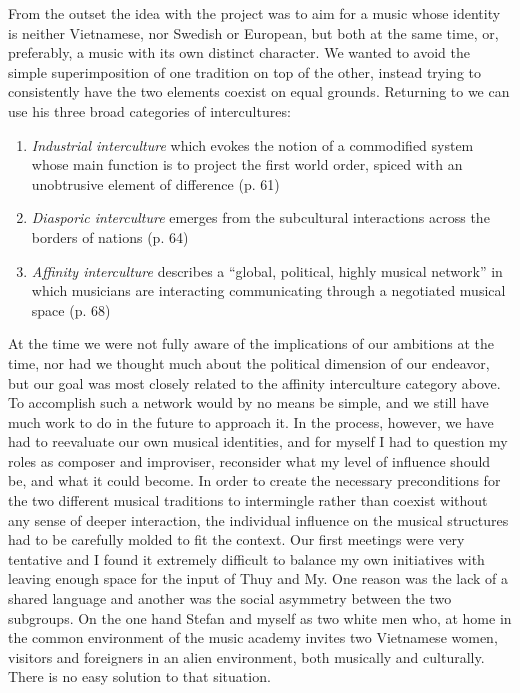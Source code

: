 \documentclass[a4paper]{article}
\begin{document}
From the outset the idea with the project was to aim for a music whose identity is neither Vietnamese, nor Swedish or European, but both at the same time, or, preferably, a music with its own distinct character. We wanted to avoid the simple superimposition of one tradition on top of the other, instead trying to consistently have the two elements coexist on equal grounds. Returning to \citet{slobin1987} we can use his three broad categories of intercultures:
\begin{enumerate}
\item \emph{Industrial interculture} which evokes the notion of a commodified system whose main function is to project the first world order, spiced with an unobtrusive element of difference (p. 61)
\item \emph{Diasporic interculture} emerges from the subcultural interactions across the borders of nations (p. 64)
\item \emph{Affinity interculture} describes a ``global, political, highly musical network'' in which musicians are interacting communicating through a negotiated musical space (p. 68)
\end{enumerate}
At the time we were not fully aware of the implications of our ambitions at the time, nor had we thought much about the political dimension of our endeavor, but our goal was most closely related to the affinity interculture category above. To accomplish such a network would by no means be simple, and we still have much work to do in the future to approach it. In the process, however, we have had to reevaluate our own musical identities, and for myself I had to question my roles as composer and improviser, reconsider what my level of influence should be, and what it could become. In order to create the necessary preconditions for the two different musical traditions to intermingle rather than coexist without any sense of deeper interaction, the individual influence on the musical structures had to be carefully molded to fit the context. Our first meetings were very tentative and I found it extremely difficult to balance my own initiatives with leaving enough space for the input of Thuy and My. One reason was the lack of a shared language and another was the social asymmetry between the two subgroups. On the one hand Stefan and myself as two white men who, at home in the common environment of the music academy invites two Vietnamese women, visitors and foreigners in an alien environment, both musically and culturally. There is no easy solution to that situation.
\end{document}
